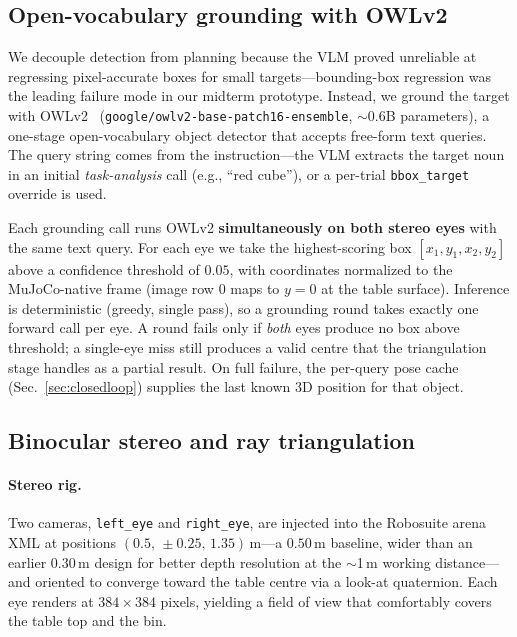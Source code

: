 \documentclass[conference]{IEEEtran}
\begin{document}
\subsection{Open-vocabulary grounding with OWLv2}
\label{sec:owlv2}

We decouple detection from planning because the VLM proved unreliable at regressing pixel-accurate boxes for small targets---bounding-box regression was the leading failure mode in our midterm prototype. Instead, we ground the target with OWLv2~\cite{owlv2} (\texttt{google/owlv2-base-patch16-ensemble}, $\sim$0.6B parameters), a one-stage open-vocabulary object detector that accepts free-form text queries. The query string comes from the instruction---the VLM extracts the target noun in an initial \emph{task-analysis} call (e.g., ``red cube''), or a per-trial \texttt{bbox\_target} override is used.

Each grounding call runs OWLv2 \textbf{simultaneously on both stereo eyes} with the same text query. For each eye we take the highest-scoring box $[x_1,y_1,x_2,y_2]$ above a confidence threshold of $0.05$, with coordinates normalized to the MuJoCo-native frame (image row 0 maps to $y=0$ at the table surface). Inference is deterministic (greedy, single pass), so a grounding round takes exactly one forward call per eye. A round fails only if \emph{both} eyes produce no box above threshold; a single-eye miss still produces a valid centre that the triangulation stage handles as a partial result. On full failure, the per-query pose cache (Sec.~\ref{sec:closedloop}) supplies the last known 3D position for that object.

\subsection{Binocular stereo and ray triangulation}
\label{sec:stereo}

\paragraph{Stereo rig.}
Two cameras, \texttt{left\_eye} and \texttt{right\_eye}, are injected into the Robosuite arena XML at positions $(0.5,\,\pm0.25,\,1.35)$\,m---a $0.50$\,m baseline, wider than an earlier $0.30$\,m design for better depth resolution at the $\sim$1\,m working distance---and oriented to converge toward the table centre via a look-at quaternion. Each eye renders at $384\times384$ pixels, yielding a field of view that comfortably covers the table top and the bin.
\end{document}
